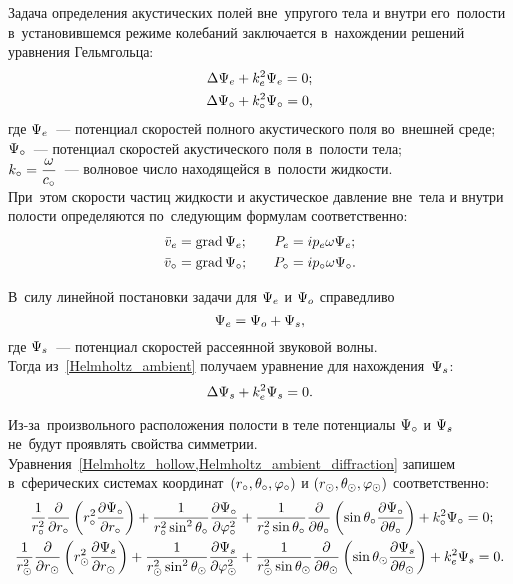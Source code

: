 Задача определения акустических полей вне~упругого тела и внутри его~полости в~установившемся режиме колебаний заключается в~нахождении решений уравнения Гельмгольца:
\begin{align}
\Lap\P\en &+ k\en^2\P\en = 0;\label{Helmholtz_ambient}\\
\Lap\P\c &+ k\c^2\P\c = 0,\label{Helmholtz_hollow}
\end{align}
где $\P\en$~--- потенциал скоростей полного акустического поля во~внешней среде;\\
$\P\c$~--- потенциал скоростей акустического поля в~полости тела;\\
$k\c = \df{\om}{c\c}$~--- волновое число находящейся в~полости жидкости.\\ При~этом скорости частиц жидкости и акустическое давление вне~тела и внутри полости определяются по~следующим формулам соответственно:
\begin{align}
\bar{v}\en &= \grad\P\en; &\q P\en &= ip\en\om\P\en;\\
\bar{v}\c &= \grad\P\c; &\q P\c &= ip\c\om\P\c.
\end{align}


В~силу линейной постановки задачи для $\P\en$ и $\P\o$ справедливо
\begin{equation} \label{potention_speed_ambient}
\P\en = \P\o + \P\sc,
\end{equation}
где $\P\sc$~--- потенциал скоростей рассеянной звуковой волны.\\
Тогда из~\eqref{Helmholtz_ambient} получаем уравнение для нахождения~$\P\sc$:
\begin{equation} \label{Helmholtz_ambient_diffraction}
\Lap\P\sc + k\en^2\P\sc = 0.
\end{equation}

Из-за~произвольного расположения полости в теле потенциалы $\P\c$ и $\P\sc$ не~будут проявлять свойства симметрии.
Уравнения~\cref{Helmholtz_hollow,Helmholtz_ambient_diffraction} запишем в~сферических системах координат~$(r\c, \Q\c, \f\c)$ и $(r\s, \Q\s, \f\s)$ соответственно:
\begin{align}
\fr1{r\c^2}\fr\de{\de r\c}\left(r\c^2 \fr{\de\P\c}{\de r\c}\right) + \fr1{r\c^2\sin^2\Q\c}\fr{\de\P\c}{\de\f\c^2} &+ \fr1{r\c^2\sin\Q\c}\fr\de{\de\Q\c} \left(\sin\Q\c \fr{\de\P\c}{\de\Q\c}\right) + k\c^2\P\c = 0;\\
\fr1{r\s^2}\fr\de{\de r\s}\left(r\s^2 \fr{\de\P\sc}{\de r\s}\right) + \fr1{r\s^2\sin^2\Q\s}\fr{\de\P\sc}{\de\f\s^2} &+ \fr1{r\s^2\sin\Q\s}\fr\de{\de\Q\s} \left(\sin\Q\s \fr{\de\P\sc}{\de\Q\s}\right) + k\en^2\P\sc = 0.
\end{align}


